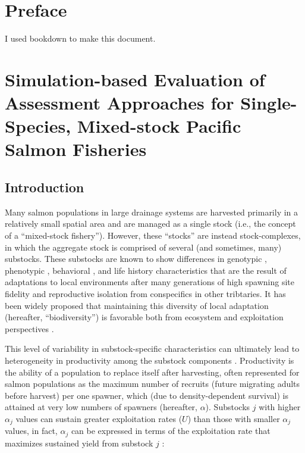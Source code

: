 \documentclass[12pt,]{book}
\theoremstyle{definition}
\theoremstyle{definition}
\theoremstyle{definition}
\theoremstyle{remark}
\begin{document}
\setlength{\parskip}{0pt plus 0pt minus 0pt}

\doublespacing

\chapter*{Preface}\label{preface}

I used bookdown \citep{xie-2015} to make this document.

\chapter{Simulation-based Evaluation of Assessment Approaches for
Single-Species, Mixed-stock Pacific Salmon Fisheries}\label{ch4}

\section{Introduction}\label{introduction}

\noindent
Many salmon populations in large drainage systems are harvested
primarily in a relatively small spatial area and are managed as a single
stock (i.e., the concept of a ``mixed-stock fishery''). However, these
``stocks'' are instead stock-complexes, in which the aggregate stock is
comprised of several (and sometimes, many) substocks. These substocks
are known to show differences in genotypic \citep{templin-etal-2004},
phenotypic \citep[e.g., morphology;][]{hendry-quinn-1997}, behavioral
\citep[e.g., run timing;][]{clark-etal-2015, smith-liller-2017}, and
life history \citep[i.e., age-at-maturation,][]{blair-etal-1993}
characteristics that are the result of adaptations to local environments
after many generations of high spawning site fidelity and reproductive
isolation from conspecifics in other tribtaries. It has been widely
proposed that maintaining this diversity of local adaptation (hereafter,
``biodiversity'') is favorable both from ecosystem and exploitation
perspectives \citep[i.e., the statistical dampening of random
variability in a system made up of many additive random processes,
otherwise known as the ``portfolio
effect'';][]{schindler-etal-2010, schindler-etal-2015}.

This level of variability in substock-specific characteristics can
ultimately lead to heterogeneity in productivity among the substock
components \citep{walters-martell-2004}. Productivity is the ability of
a population to replace itself after harvesting, often represented for
salmon populations as the maximum number of recruits (future migrating
adults before harvest) per one spawner, which (due to density-dependent
survival) is attained at very low numbers of spawners (hereafter,
\(\alpha\)). Substocks \(j\) with higher \(\alpha_j\) values can sustain
greater exploitation rates (\(U\)) than those with smaller \(\alpha_j\)
values, in fact, \(\alpha_j\) can be expressed in terms of the
exploitation rate that maximizes sustained yield from substock \(j\)
\citep{schnute-kronlund-2002}:
\end{document}
